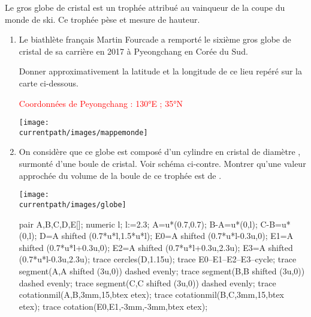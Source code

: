 \begin{corrige}
        Le gros globe de cristal est un trophée attribué au vainqueur de la coupe du monde de ski.
    Ce trophée pèse  et mesure  de hauteur.

    \begin{enumerate}
        \item Le biathlète français Martin Fourcade a remporté le sixième gros globe de cristal de
        sa carrière en 2017 à Pyeongchang en Corée du Sud.

        Donner approximativement la latitude et la longitude de ce lieu repéré sur la carte ci-dessous.

        \textcolor{red}{Coordonnées de Peyongchang : \ang{130}E ; \ang{35}N}

        \texttt{[image: \\currentpath/images/mappemonde]}            

        \item On considère que ce globe est composé d'un cylindre en cristal de diamètre , surmonté d'une boule de cristal.
        Voir schéma ci-contre. Montrer qu'une valeur approchée du volume de la boule de ce trophée est de .

        \begin{minipage}{0.4\linewidth}
            \vspace*{-10mm}
            \texttt{[image: \\currentpath/images/globe]}
        \end{minipage}            
        \begin{minipage}{0.4\linewidth}
            \begin{Geometrie}
                pair A,B,C,D,E[];
                numeric l;
                l:=2.3;
                A=u*(0.7,0.7);
                B-A=u*(0,l);
                C-B=u*(0,l);
                D=A shifted (0.7*u*l,1.5*u*l);
                E0=A shifted (0.7*u*l-0.3u,0);
                E1=A shifted (0.7*u*l+0.3u,0);
                E2=A shifted (0.7*u*l+0.3u,2.3u);
                E3=A shifted (0.7*u*l-0.3u,2.3u);
                trace cercles(D,1.15u);
                trace E0--E1--E2--E3--cycle;
                trace segment(A,A shifted (3u,0)) dashed evenly;
                trace segment(B,B shifted (3u,0)) dashed evenly;
                trace segment(C,C shifted (3u,0)) dashed evenly;
                trace cotationmil(A,B,3mm,15,btex  etex);
                trace cotationmil(B,C,3mm,15,btex  etex);
                trace cotation(E0,E1,-3mm,-3mm,btex  etex);
            \end{Geometrie}
        \end{minipage}


\end{enumerate}
\end{corrige}
